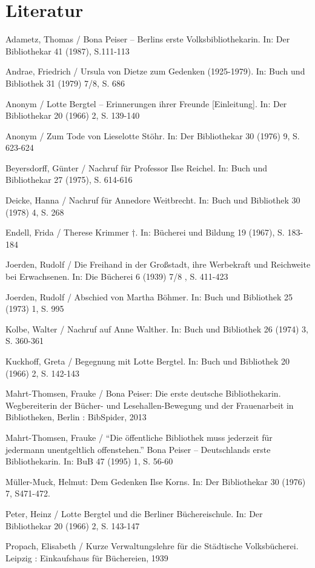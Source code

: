 \documentclass[a4paper,
fontsize=11pt,
oneside,
numbers=noperiodatend,
parskip=half-,
bibliography=totoc,
final
]{scrartcl}
\begin{document}
\section*{Literatur}\label{literatur}

Adametz, Thomas / Bona Peiser -- Berlins erste Volksbibliothekarin. In:
Der Bibliothekar 41 (1987), S.111-113

Andrae, Friedrich / Ursula von Dietze zum Gedenken (1925-1979). In: Buch
und Bibliothek 31 (1979) 7/8, S. 686

Anonym / Lotte Bergtel -- Erinnerungen ihrer Freunde {[}Einleitung{]}.
In: Der Bibliothekar 20 (1966) 2, S. 139-140

Anonym / Zum Tode von Lieselotte Stöhr. In: Der Bibliothekar 30 (1976)
9, S. 623-624

Beyersdorff, Günter / Nachruf für Professor Ilse Reichel. In: Buch und
Bibliothekar 27 (1975), S. 614-616

Deicke, Hanna / Nachruf für Annedore Weitbrecht. In: Buch und Bibliothek
30 (1978) 4, S. 268

Endell, Frida / Therese Krimmer †. In: Bücherei und Bildung 19 (1967),
S. 183-184

Joerden, Rudolf / Die Freihand in der Großstadt, ihre Werbekraft und
Reichweite bei Erwachsenen. In: Die Bücherei 6 (1939) 7/8 , S. 411-423

Joerden, Rudolf / Abschied von Martha Böhmer. In: Buch und Bibliothek 25
(1973) 1, S. 995

Kolbe, Walter / Nachruf auf Anne Walther. In: Buch und Bibliothek 26
(1974) 3, S. 360-361

Kuckhoff, Greta / Begegnung mit Lotte Bergtel. In: Buch und Bibliothek
20 (1966) 2, S. 142-143

Mahrt-Thomsen, Frauke / Bona Peiser: Die erste deutsche Bibliothekarin.
Wegbereiterin der Bücher- und Lesehallen-Bewegung und der Frauenarbeit
in Bibliotheken, Berlin : BibSpider, 2013

Mahrt-Thomsen, Frauke / \enquote{Die öffentliche Bibliothek muss
jederzeit für jedermann unentgeltlich offenstehen.} Bona Peiser --
Deutschlands erste Bibliothekarin. In: BuB 47 (1995) 1, S. 56-60

Müller-Muck, Helmut: Dem Gedenken Ilse Korns. In: Der Bibliothekar 30
(1976) 7, S471-472.

Peter, Heinz / Lotte Bergtel und die Berliner Büchereischule. In: Der
Bibliothekar 20 (1966) 2, S. 143-147

Propach, Elisabeth / Kurze Verwaltungslehre für die Städtische
Volksbücherei. Leipzig : Einkaufshaus für Büchereien, 1939
\end{document}
